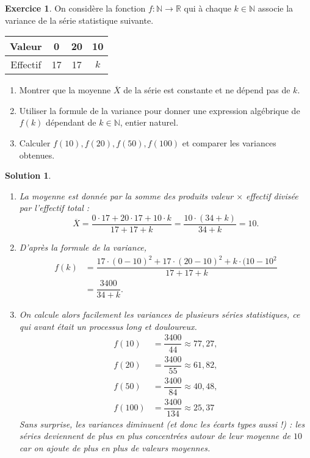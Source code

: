 \documentclass[a4paper, 14pt]{extarticle}
\theoremstyle{plain}
\newtheorem*{sol}{Solution}
\theoremstyle{definition}
\newtheorem{ex}{Exercice}
\newcommand{\R}{\mathbb{R}}
\newcommand{\N}{\mathbb{N}}
\newcommand{\exe}[2]{
		\begin{ex} #1  \end{ex}
		\begin{sol} #2 \end{sol}
	}
\newcommand{\exe}[2]{
		\begin{ex} #1  \end{ex}
	}
\begin{document}
	
	\exe{
		On considère la fonction $f:\N\rightarrow\R$ qui à chaque $k\in\N$ associe la variance de la série statistique suivante.
		
		
		\begin{center}
		\begin{tabular}{|c|c|c|c|}\hline
		Valeur   & 0 & 20 & 10 \\ \hline
		Effectif & 17 & 17 & $k$ \\ \hline
		\end{tabular}
		\end{center}
		
		\begin{enumerate}
			\item
			Montrer que la moyenne $\overline{X}$ de la série est constante et ne dépend pas de $k$.
			\item
			Utiliser la formule de la variance pour donner une expression algébrique de $f(k)$ dépendant de $k\in\N$, entier naturel.
			\item
			Calculer $f(10), f(20), f(50), f(100)$ et comparer les variances obtenues.
		\end{enumerate}
	}{
		\begin{enumerate}
			\item
			La moyenne est donnée par la somme des produits valeur $\times$ effectif divisée par l'effectif total :
				\[ \overline{X} = \dfrac{0\cdot17 + 20\cdot17 + 10\cdot k}{17+17+k} =\dfrac{10\cdot(34+k)}{34+k} = 10.
				\]
			\item
			D'après la formule de la variance,
				\begin{align*}
					f(k) &= \dfrac{17 \cdot (0-10)^2 + 17 \cdot (20-10)^2 + k \cdot(10-10^2}{17+17+k} \\
						&= \dfrac{3400}{34+k}.
				\end{align*}
			\item
			On calcule alors facilement les variances de plusieurs séries statistiques, ce qui avant était un processus long et douloureux.
				\begin{align*}
					f(10) &= \dfrac{3400}{44} \approx 77,27, \\
					f(20) &= \dfrac{3400}{55} \approx 61,82, \\
					f(50) &= \dfrac{3400}{84} \approx 40,48, \\
					f(100) &= \dfrac{3400}{134}\approx 25,37
				\end{align*}
			Sans surprise, les variances diminuent (et donc les écarts types aussi !) : les séries deviennent de plus en plus concentrées autour de leur moyenne de $10$ car on ajoute de plus en plus de valeurs moyennes.
		\end{enumerate}
	
	
	}
\end{document}
